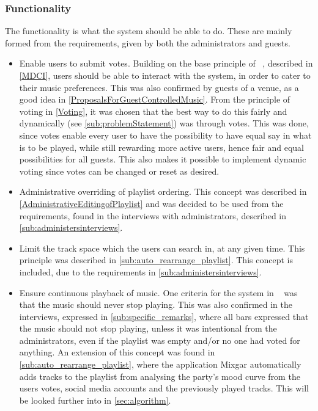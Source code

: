 \subsubsection{Functionality}
\label{subsub:functionality}
The functionality is what the system should be able to do. These are mainly formed from the requirements, given by both the administrators and guests.
\begin{itemize}
    \item Enable users to submit votes. Building on the base principle of ~\cite{sorensen2012}, described in \cref{MDCI}, users should be able to interact with the system, in order to cater to their music preferences. This was also confirmed by guests of a venue, as a good idea in \cref{ProposalsForGuestControlledMusic}. From the principle of voting in \cref{Voting}, it was chosen that the best way to do this fairly and dynamically (see \cref{sub:problemStatement}) was through votes. This was done, since votes enable every user to have the possibility to have equal say in what is to be played, while still rewarding more active users, hence fair and equal possibilities for all guests. This also makes it possible to implement dynamic voting since votes can be changed or reset as desired.
    \item Administrative overriding of playlist ordering. This concept was described in \cref{AdministrativeEditingofPlaylist} and was decided to be used from the requirements, found in the interviews with administrators, described in \cref{sub:administersinterviews}.
    \item Limit the track space which the users can search in, at any given time. This principle was described in \cref{sub:auto_rearrange_playlist}. This concept is included, due to the requirements in \cref{sub:administersinterviews}.
		\item Ensure continuous playback of music. One criteria for the system in ~\cite{sorensen2012} was that the music should never stop playing. This was also confirmed in the interviews, expressed in \cref{sub:specific_remarks}, where all bars expressed that the music should not stop playing, unless it was intentional from the administrators, even if the playlist was empty and/or no one had voted for anything. An extension of this concept was found in \cref{sub:auto_rearrange_playlist}, where the application Mixgar automatically adds tracks to the playlist from analysing the party’s mood curve from the users votes, social media accounts and the previously played tracks. This will be looked further into in \cref{sec:algorithm}.

\end{itemize}
